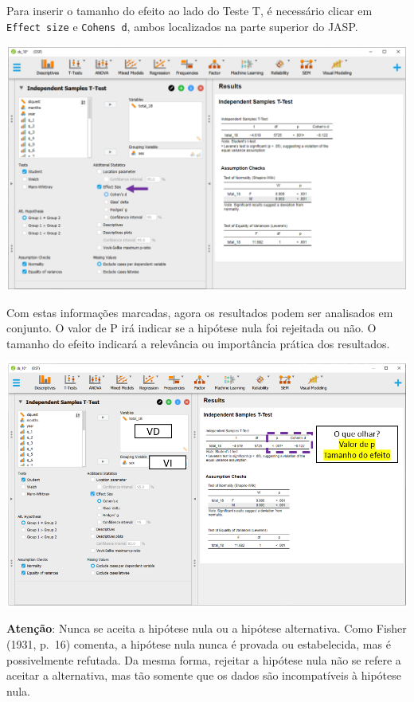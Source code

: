 \documentclass[
]{book}
\begin{document}
Para inserir o tamanho do efeito ao lado do Teste T, é necessário clicar em \texttt{Effect\ size} e \texttt{Cohen\textquotesingle{}s\ d}, ambos localizados na parte superior do JASP.

\includegraphics{./img/cap_testet_tamanho_do_efeito.png}

Com estas informações marcadas, agora os resultados podem ser analisados em conjunto. O valor de P irá indicar se a hipótese nula foi rejeitada ou não. O tamanho do efeito indicará a relevância ou importância prática dos resultados.

\includegraphics{./img/cap_testet_resultados.png}

\textbf{Atenção}: Nunca se aceita a hipótese nula ou a hipótese alternativa. Como Fisher (1931, p.~16) comenta, a hipótese nula nunca é provada ou estabelecida, mas é possivelmente refutada. Da mesma forma, rejeitar a hipótese nula não se refere a aceitar a alternativa, mas tão somente que os dados são incompatíveis à hipótese nula.
\end{document}

